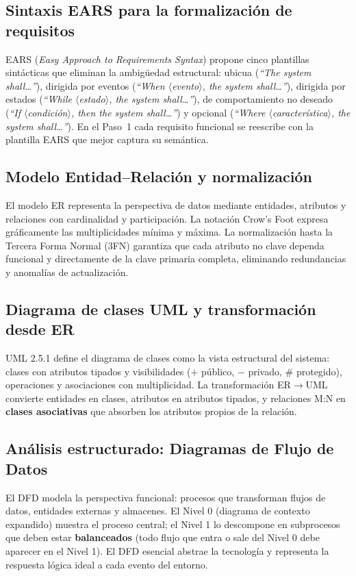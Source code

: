 \documentclass[11pt,a4paper]{article}
\renewcommand{\_}{\textunderscore\allowbreak}
\begin{document}
\subsection{Sintaxis EARS para la formalización de requisitos}
EARS (\textit{Easy Approach to Requirements Syntax}) \cite{mavin2009} propone cinco plantillas sintácticas que eliminan la ambigüedad estructural: ubicua (\textit{``The system shall\ldots''}), dirigida por eventos (\textit{``When $\langle$evento$\rangle$, the system shall\ldots''}), dirigida por estados (\textit{``While $\langle$estado$\rangle$, the system shall\ldots''}), de comportamiento no deseado (\textit{``If $\langle$condición$\rangle$, then the system shall\ldots''}) y opcional (\textit{``Where $\langle$característica$\rangle$, the system shall\ldots''}). En el Paso~1 cada requisito funcional se reescribe con la plantilla EARS que mejor captura su semántica.

\subsection{Modelo Entidad--Relación y normalización}
El modelo ER \cite{chen1976} representa la perspectiva de datos mediante entidades, atributos y relaciones con cardinalidad y participación. La notación Crow's Foot expresa gráficamente las multiplicidades mínima y máxima. La normalización hasta la Tercera Forma Normal (3FN) \cite{elmasri2016} garantiza que cada atributo no clave dependa funcional y directamente de la clave primaria completa, eliminando redundancias y anomalías de actualización.

\subsection{Diagrama de clases UML y transformación desde ER}
UML 2.5.1 \cite{omg2017} define el diagrama de clases como la vista estructural del sistema: clases con atributos tipados y visibilidades ($+$ público, $-$ privado, $\#$ protegido), operaciones y asociaciones con multiplicidad. La transformación ER$\rightarrow$UML convierte entidades en clases, atributos en atributos tipados, y relaciones M:N en \textbf{clases asociativas} que absorben los atributos propios de la relación.

\subsection{Análisis estructurado: Diagramas de Flujo de Datos}
El DFD \cite{yourdon1989} modela la perspectiva funcional: procesos que transforman flujos de datos, entidades externas y almacenes. El Nivel 0 (diagrama de contexto expandido) muestra el proceso central; el Nivel 1 lo descompone en subprocesos que deben estar \textbf{balanceados} (todo flujo que entra o sale del Nivel 0 debe aparecer en el Nivel 1). El DFD esencial abstrae la tecnología y representa la respuesta lógica ideal a cada evento del entorno.
\end{document}
